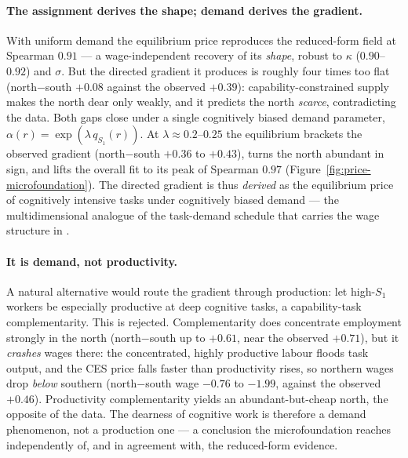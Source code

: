 \paragraph{The assignment derives the shape; demand derives the gradient.}
With uniform demand the equilibrium price reproduces the reduced-form field at
Spearman $0.91$ --- a wage-independent recovery of its \emph{shape}, robust to
$\kappa$ ($0.90$--$0.92$) and $\sigma$. But the directed gradient it produces is
roughly four times too flat (north$-$south $+0.08$ against the observed $+0.39$):
capability-constrained supply makes the north dear only weakly, and it predicts
the north \emph{scarce}, contradicting the data. Both gaps close under a single
cognitively biased demand parameter, $\alpha(r) = \exp(\lambda\, q_{S_1}(r))$. At
$\lambda \approx 0.2$--$0.25$ the equilibrium brackets the observed gradient
(north$-$south $+0.36$ to $+0.43$), turns the north abundant in sign, and lifts
the overall fit to its peak of Spearman $0.97$ (Figure~\ref{fig:price-microfoundation}).
The directed gradient is thus \emph{derived} as the equilibrium price of
cognitively intensive tasks under cognitively biased demand --- the
multidimensional analogue of the task-demand schedule that carries the wage
structure in \textcite{acemoglu2022tasks}.

\paragraph{It is demand, not productivity.}
A natural alternative would route the gradient through production: let
high-$S_1$ workers be especially productive at deep cognitive tasks, a
capability-task complementarity. This is rejected. Complementarity does
concentrate employment strongly in the north (north$-$south up to $+0.61$,
near the observed $+0.71$), but it \emph{crashes} wages there: the concentrated,
highly productive labour floods task output, and the CES price falls faster than
productivity rises, so northern wages drop \emph{below} southern (north$-$south
wage $-0.76$ to $-1.99$, against the observed $+0.46$). Productivity
complementarity yields an abundant-but-cheap north, the opposite of the data. The
dearness of cognitive work is therefore a demand phenomenon, not a production
one --- a conclusion the microfoundation reaches independently of, and in
agreement with, the reduced-form evidence.

